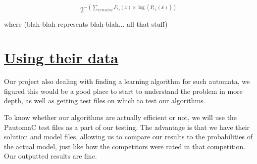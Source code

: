 {\huge{}
\[
2^{-(\sum_{x\epsilon TestSet}P_{r_{T}}(x)\times\log(P_{r_{C}}(x)))}
\]
}{\huge \par}

where (blah-blah represents blah-blah... all that stuff)


\part*{{\large{}\uline{Using their data}}}

\enskip{}\enskip{}\enskip{}Our project also dealing with finding
a learning algorithm for such automata, we figured this would be a
good place to start to understand the problem in more depth, as well
as getting test files on which to test our algorithms.

To know whether our algorithms are actually efficient or not, we will
use the PautomaC test files as a part of our testing. The advantage
is that we have their solution and model files, allowing us to compare
our results to the probabilities of the actual model, just like how
the competitors were rated in that competition. Our outputted results
are fine.